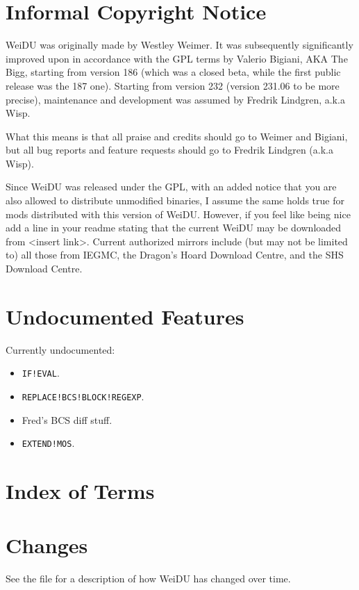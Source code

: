 \documentclass{article}
\begin{document}
\section{Informal Copyright Notice}
WeiDU was originally made by Westley Weimer. It was subsequently significantly
improved upon in accordance with the GPL terms by Valerio Bigiani, AKA The Bigg,
starting from version 186 (which was a closed beta, while the first public
release was the 187 one). Starting from version 232 (version 231.06 to be more precise),
maintenance and development was assumed by Fredrik Lindgren, a.k.a Wisp.

What this means is that all praise and credits should go to Weimer and Bigiani,
but all bug reports and feature requests should go to Fredrik Lindgren (a.k.a Wisp).

Since WeiDU was released under the GPL, with an added notice that you are also
allowed to distribute unmodified binaries, I assume the same holds true for
mods distributed with this version of WeiDU. However, if you feel like being
nice add a line in your readme stating that the current WeiDU may be downloaded
from <insert link>. Current authorized mirrors include (but may not be limited to)
all those from IEGMC, the Dragon's Hoard Download Centre, and the SHS Download Centre.

\section{Undocumented Features}

Currently undocumented:
\begin{itemize}
\item {\tt IF!EVAL}.
\item {\tt REPLACE!BCS!BLOCK!REGEXP}.
\item Fred's BCS diff stuff.
\item {\tt EXTEND!MOS}.
\end{itemize}

\section{Index of Terms}

\printindex

\section{Changes}
See the file
for a description of how WeiDU
has changed over time.
\end{document}
